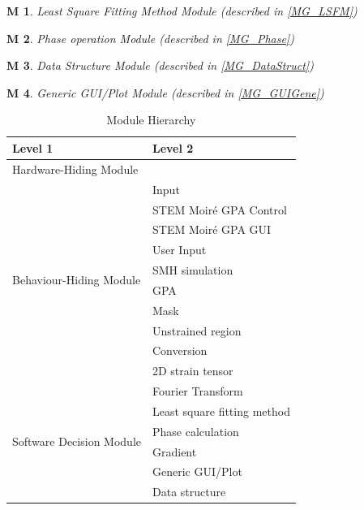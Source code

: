 \documentclass[12pt, titlepage]{article}
\newcommand{\progname}{STEM Moir{\'e} GPA}
\newtheorem{M}{M}
\begin{document}
\begin{M}\normalfont Least Square Fitting Method Module (described in \cref{MG_LSFM})
\label{M_LSFM}
\end{M}

\begin{M}\normalfont Phase operation Module (described in \cref{MG_Phase})
\label{M_Phase}
\end{M}

\begin{M}\normalfont Data Structure Module (described in \cref{MG_DataStruct})
\label{M_DataStruct}
\end{M}

\begin{M}\normalfont Generic GUI/Plot Module (described in \cref{MG_GUIGene})
\label{M_GUIGene}
\end{M}

\begin{table}[H]
\centering
\begin{tabular}{p{} p{}}
\toprule
\textbf{Level 1} & \textbf{Level 2}\\
\midrule

{Hardware-Hiding Module} & ~ \\
\midrule

\multirow{10}{0.3\textwidth}{Behaviour-Hiding Module} & Input\\
& \progname{} Control \\
& \progname{} GUI \\
& User Input \\
& SMH simulation \\
& GPA \\
& Mask \\
& Unstrained region \\
& Conversion \\
& 2D strain tensor \\
\midrule

\multirow{7}{0.3\textwidth}{Software Decision Module} & Fourier Transform \\
& Least square fitting method \\
& Phase calculation \\
& Gradient \\
& Generic GUI/Plot \\
& Data structure \\
\bottomrule

\end{tabular}
\caption{Module Hierarchy}
\label{TblMH}
\end{table}
\end{document}
